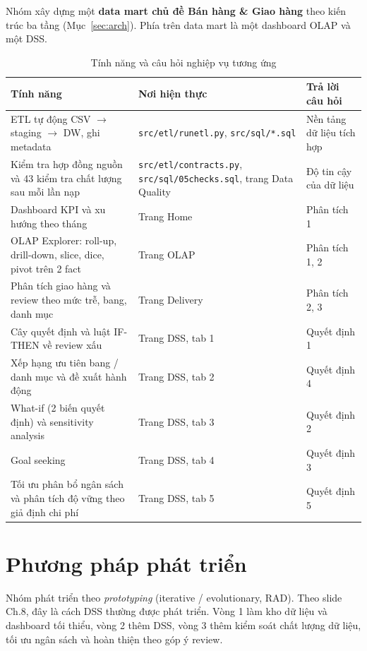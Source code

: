 \documentclass[12pt,a4paper]{report}
\newcommand{\code}[1]{\texttt{#1}}
\renewcommand{\_}{\oldunderscore\allowbreak}
\begin{document}
Nhóm xây dựng một \textbf{data mart chủ đề Bán hàng \& Giao hàng} theo kiến trúc ba tầng (Mục~\ref{sec:arch}). Phía trên data mart là một dashboard OLAP và một DSS.

\begin{table}[H]
\centering\small
\caption{Tính năng và câu hỏi nghiệp vụ tương ứng}
\begin{tabular}{L{6.4cm}L{5cm}L{3cm}}
\toprule
Tính năng & Nơi hiện thực & Trả lời câu hỏi \\
\midrule
ETL tự động CSV $\rightarrow$ staging $\rightarrow$ DW, ghi metadata & \code{src/etl/run\_etl.py}, \code{src/sql/*.sql} & Nền tảng dữ liệu tích hợp \\
Kiểm tra hợp đồng nguồn và 43 kiểm tra chất lượng sau mỗi lần nạp & \code{src/etl/contracts.py}, \code{src/sql/05\_checks.sql}, trang Data Quality & Độ tin cậy của dữ liệu \\
Dashboard KPI và xu hướng theo tháng & Trang Home & Phân tích 1 \\
OLAP Explorer: roll-up, drill-down, slice, dice, pivot trên 2 fact & Trang OLAP & Phân tích 1, 2 \\
Phân tích giao hàng và review theo mức trễ, bang, danh mục & Trang Delivery & Phân tích 2, 3 \\
Cây quyết định và luật IF-THEN về review xấu & Trang DSS, tab 1 & Quyết định 1 \\
Xếp hạng ưu tiên bang / danh mục và đề xuất hành động & Trang DSS, tab 2 & Quyết định 4 \\
What-if (2 biến quyết định) và sensitivity analysis & Trang DSS, tab 3 & Quyết định 2 \\
Goal seeking & Trang DSS, tab 4 & Quyết định 3 \\
Tối ưu phân bổ ngân sách và phân tích độ vững theo giả định chi phí & Trang DSS, tab 5 & Quyết định 5 \\
\bottomrule
\end{tabular}
\end{table}

\section{Phương pháp phát triển}\label{sec:method}

Nhóm phát triển theo \emph{prototyping} (iterative / evolutionary, RAD). Theo slide Ch.8, đây là cách DSS thường được phát triển. Vòng 1 làm kho dữ liệu và dashboard tối thiểu, vòng 2 thêm DSS, vòng 3 thêm kiểm soát chất lượng dữ liệu, tối ưu ngân sách và hoàn thiện theo góp ý review.
\end{document}
